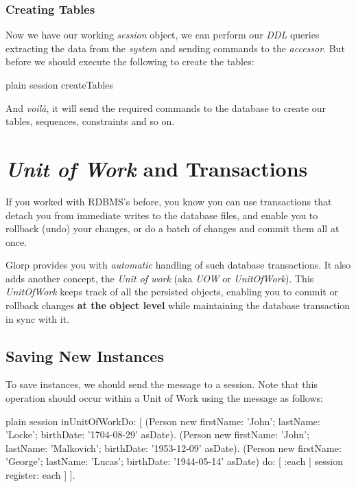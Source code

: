 \documentclass[10pt,twoside,english]{_support/latex/sbabook/sbabook}
\begin{document}
\subsection{Creating Tables}
Now we have our working \textit{session} object, we can perform our \textit{DDL} queries
extracting the data from the \textit{system} and sending commands to
the \textit{accessor}. But before we should execute the following to create the tables:

\begin{displaycode}{plain}
session createTables
\end{displaycode}

And \textit{voil\`{a}}, it will send the required commands to the database to create our tables,
sequences, constraints and so on.
\chapter{\textit{Unit of Work} and Transactions}
If you worked with RDBMS's before, you know you can use transactions that
detach you from immediate writes to the database files, and enable you to
rollback (undo) your changes, or do a batch of changes and commit
them all at once.

Glorp provides you with \textit{automatic} handling of such database transactions.
It also adds another concept, the \textit{Unit of work} (aka \textit{UOW} or \textit{UnitOfWork}).
This \textit{UnitOfWork} keeps track of all the persisted objects, enabling
you to commit or rollback changes \textbf{at the object level} while maintaining
the database transaction in sync with it.
\section{Saving New Instances}
To save instances,  we should send the message  to a session.
Note that this operation should occur within a Unit of Work using the message
 as follows:

\begin{displaycode}{plain}
session inUnitOfWorkDo: [
	{
		(Person new
			firstName: 'John'; lastName: 'Locke';
			birthDate: '1704-08-29' asDate).
		(Person new
			firstName: 'John'; lastName: 'Malkovich';
			birthDate: '1953-12-09' asDate).
		(Person new
			firstName: 'George'; lastName: 'Lucas';
			birthDate: '1944-05-14' asDate)
	} do: [ :each | session register: each ]
].
\end{displaycode}
\end{document}
